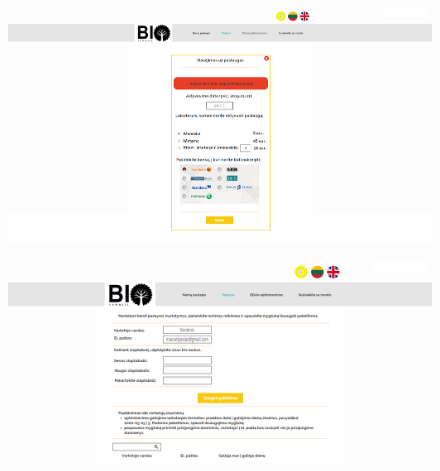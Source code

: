 \documentclass[a4paper,12pt]{article}
\begin{document}
\begin{figure}[!tph]
\hspace{-2cm}
\centering
\includegraphics[scale=0.45]{interfeisai/paskyrosPuslapisVartotojasMokejimasSuKlaida}
\label{fig:verticalcell}
\end{figure}


\begin{figure}[!tph]
\hspace{-2cm}
\centering
\includegraphics[scale=0.45]{interfeisai/paskyrosPuslapisAdministratorius}
\label{fig:verticalcell}
\end{figure}

\clearpage
\end{document}
